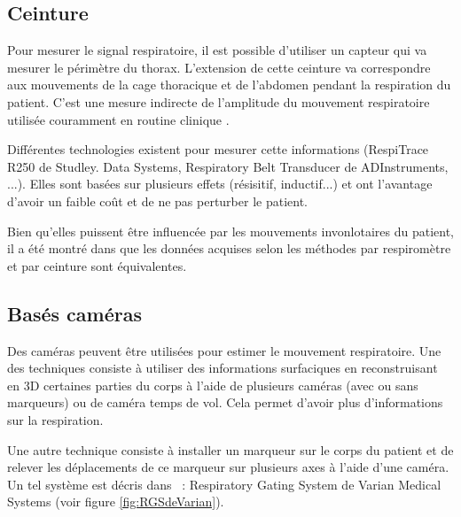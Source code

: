 \subsection{Ceinture}

Pour mesurer le signal respiratoire, il est possible d'utiliser un capteur qui va mesurer le périmètre du thorax. L'extension de cette ceinture va correspondre aux mouvements de la cage thoracique et de l'abdomen pendant la respiration du patient. C'est une mesure indirecte de l'amplitude du mouvement respiratoire utilisée couramment en routine clinique . 

Différentes technologies existent pour mesurer cette informations (RespiTrace R250 de Studley. Data Systems, Respiratory Belt Transducer de ADInstruments, ...). Elles sont basées sur plusieurs effets (résisitif, inductif...) et ont l'avantage d'avoir un faible coût et de ne pas perturber le patient.

Bien qu'elles puissent être influencée par les mouvements invonlotaires du patient, il a été montré dans \cite{Guivarch2004Sync} que les données acquises selon les méthodes par respiromètre et par ceinture sont équivalentes.

\subsection{Basés caméras}

Des caméras peuvent être utilisées pour estimer le mouvement respiratoire. Une des techniques consiste à utiliser des informations surfaciques en reconstruisant en 3D certaines parties du corps à l'aide de plusieurs caméras (avec ou sans marqueurs) ou de caméra temps de vol. Cela permet d'avoir plus d'informations sur la respiration.

Une autre technique consiste à installer un marqueur sur le corps du patient et de relever les déplacements de ce marqueur sur plusieurs axes à l'aide d'une caméra. Un tel système est décris dans~\cite{nehmeh2002effect} : Respiratory Gating System de Varian Medical Systems (voir figure \ref{fig:RGSdeVarian}).


